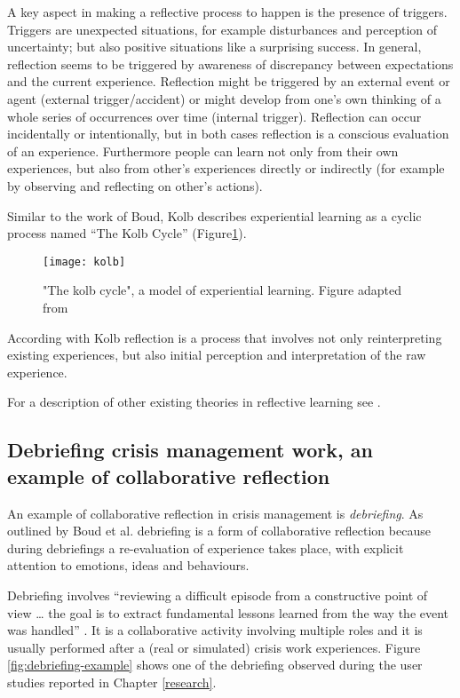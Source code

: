 A key aspect in making a reflective process to happen is the presence of
triggers. Triggers are unexpected situations, for example disturbances
and perception of uncertainty; but also positive situations like a
surprising success. In general, reflection seems to be triggered by
awareness of discrepancy between expectations and the current
experience. Reflection might be triggered by an external event or agent
(external trigger/accident) or might develop from one's own thinking of
a whole series of occurrences over time (internal trigger). Reflection
can occur incidentally or intentionally, but in both cases reflection is
a conscious evaluation of an experience. Furthermore people can learn
not only from their own experiences, but also from other's experiences
directly or indirectly (for example by observing and reflecting on
other's actions).

Similar to the work of Boud, Kolb describes experiential learning as a
cyclic process named ``The Kolb Cycle'' (Figure\ref{fig:kolb-model}).

\begin{figure}[htb]
    \centering
    \texttt{[image: kolb]}
    \caption{"The kolb cycle", a model of experiential learning. Figure adapted from \protect\cite{kolb1984organizational}}
    \label{fig:kolb-model}
\end{figure}

According with Kolb \autocite*{kolb1984experiential} reflection is a
process that involves not only reinterpreting existing experiences, but
also initial perception and interpretation of the raw experience.

For a description of other existing theories in reflective learning see
\autocite{WoodDaudelin199636}.

\subsection{Debriefing crisis management work, an example of
collaborative
reflection}\label{debriefing-crisis-management-work-an-example-of-collaborative-reflection}

An example of collaborative reflection in crisis management is
\emph{debriefing}. As outlined by Boud et al.
\autocite*{boud1985reflection} debriefing is a form of collaborative
reflection because during debriefings a re-evaluation of experience
takes place, with explicit attention to emotions, ideas and behaviours.

Debriefing involves ``reviewing a difficult episode from a constructive
point of view \ldots{} the goal is to extract fundamental lessons
learned from the way the event was handled'' \autocite{Lagadec:1997js}.
It is a collaborative activity involving multiple roles and it is
usually performed after a (real or simulated) crisis work experiences.
Figure \ref{fig:debriefing-example} shows one of the debriefing observed
during the user studies reported in Chapter \ref{research}.


